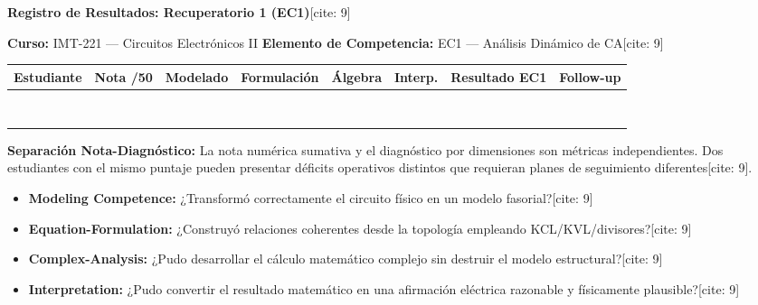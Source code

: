 \documentclass[11pt, a4paper]{article}
\begin{document}
\begin{center}
    \Large\textbf{\textcolor{ucbblue}{Registro de Resultados: Recuperatorio 1 (EC1)}}[cite: 9]
\end{center}

\textbf{Curso:} IMT-221 — Circuitos Electrónicos II \hfill \textbf{Elemento de Competencia:} EC1 — Análisis Dinámico de CA[cite: 9]

\vspace{0.4cm}
\begin{tcolorbox}[colback=white, colframe=ucbblue, title=\textbf{Tabla de Seguimiento Analítico[cite: 9]}]
    \renewcommand{\arraystretch}{1.5}
    \small
    \begin{tabularx}{\textwidth}{@{} X c c c c c c c @{}}
    \toprule
    \rowcolor[HTML]{EFEFEF}
    \textbf{Estudiante} & \textbf{Nota /50} & \textbf{Modelado} & \textbf{Formulación} & \textbf{Álgebra} & \textbf{Interp.} & \textbf{Resultado EC1} & \textbf{Follow-up} \\ \midrule
    & & & & & & & \\ \hline
    & & & & & & & \\ \hline
    & & & & & & & \\ \hline
    & & & & & & & \\ \hline
    & & & & & & & \\ \hline
    & & & & & & & \\ \hline
    & & & & & & & \\ \hline
    & & & & & & & \\
    \bottomrule
    \end{tabularx}
\end{tcolorbox}

\vspace{0.4cm}
\textbf{Separación Nota-Diagnóstico:} La nota numérica sumativa y el diagnóstico por dimensiones son métricas independientes. Dos estudiantes con el mismo puntaje pueden presentar déficits operativos distintos que requieran planes de seguimiento diferentes[cite: 9].

\vspace{0.4cm}
\begin{tcolorbox}[colback=white, colframe=black, title=\textbf{Dimensiones de la Competencia (Adecuada / Parcial / Insuficiente)[cite: 9]}]
    \begin{itemize}
        \item \textbf{Modeling Competence:} ¿Transformó correctamente el circuito físico en un modelo fasorial?[cite: 9]
        \item \textbf{Equation-Formulation:} ¿Construyó relaciones coherentes desde la topología empleando KCL/KVL/divisores?[cite: 9]
        \item \textbf{Complex-Analysis:} ¿Pudo desarrollar el cálculo matemático complejo sin destruir el modelo estructural?[cite: 9]
        \item \textbf{Interpretation:} ¿Pudo convertir el resultado matemático en una afirmación eléctrica razonable y físicamente plausible?[cite: 9]
    \end{itemize}
\end{tcolorbox}
\end{document}
